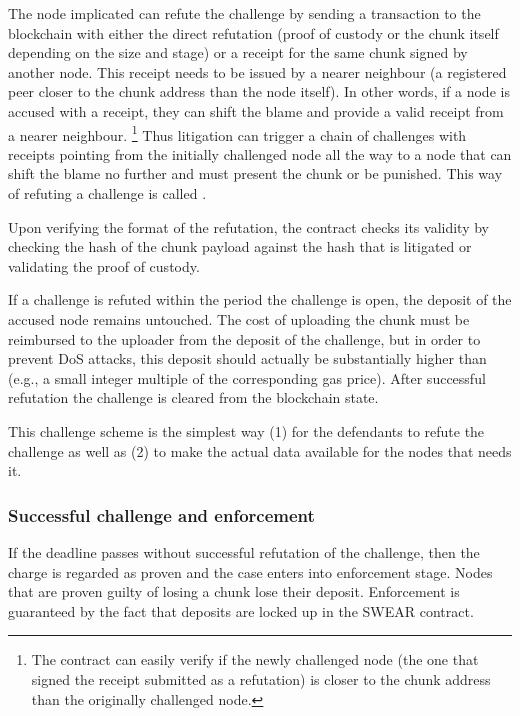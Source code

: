 The node implicated can refute the challenge by sending a transaction to the blockchain with either the direct refutation (proof of custody or the chunk itself depending on the size and stage) or a receipt for the same chunk signed by another node. This receipt needs to be issued by a nearer neighbour (a registered peer closer to the chunk address than the node itself). In other words, if a node is accused with a receipt, they can  shift the blame and provide a valid receipt from a nearer neighbour.%
%
\footnote{The contract can easily verify if the newly challenged node (the one that signed the receipt submitted as a refutation) is closer to the chunk address than the originally challenged node.}
%
Thus litigation can trigger a chain of challenges with receipts pointing from the initially challenged node all the way to a node that can shift the blame no further and must present the chunk or be punished. This way of refuting a challenge is called . 

Upon verifying the format of the refutation, the contract checks its validity by checking the hash of the chunk payload against the hash that is litigated or validating the proof of custody. 

If a challenge is refuted within the period the challenge is open, the deposit of the accused node remains untouched. The cost of uploading the chunk must be reimbursed to the uploader from the deposit of the challenge, but  in order to prevent DoS attacks, this deposit should actually be substantially higher than (e.g., a small integer multiple of the corresponding gas price). After successful refutation the challenge is cleared from the blockchain state.

This challenge scheme is the simplest way (1) for the defendants to refute the challenge as well as (2) to make the actual data available for the nodes that needs it.

\subsubsection{Successful challenge and enforcement}

If the deadline passes without successful refutation of the challenge, then the charge is regarded as proven and the case enters into enforcement stage. Nodes that are proven guilty of losing a chunk lose their deposit. Enforcement is guaranteed by the fact that deposits are locked up in the SWEAR contract.

